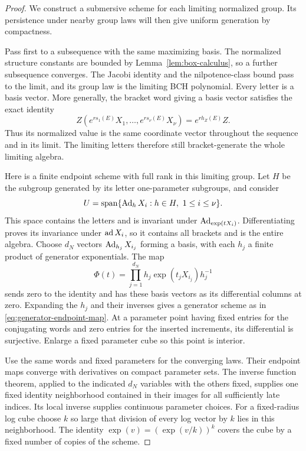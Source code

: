 \begin{proof}
We construct a submersive scheme for each limiting normalized group.
Its persistence under nearby group laws will then give uniform generation
by compactness.

Pass first to a subsequence with the same maximizing basis. The
normalized structure constants are bounded by
Lemma~\ref{lem:box-calculus}, so a further subsequence converges.
The Jacobi identity and the nilpotence-class bound pass to the
limit, and its group law is the limiting BCH polynomial.
Every letter is a basis vector. More generally, the bracket word
giving a basis vector satisfies the exact identity
\[
 Z(e^{rs_1(E)}X_1,\ldots,e^{rs_\nu(E)}X_\nu)=e^{rh_Z(E)}Z.
\]
Thus its normalized value is the same coordinate vector throughout
the sequence and in its limit. The limiting letters therefore still
bracket-generate the whole limiting algebra.

Here is a finite endpoint scheme with full rank in this limiting
group. Let $H$ be the subgroup generated by its letter
one-parameter subgroups, and consider
\[
 U=\operatorname{span}\{\operatorname{Ad}_hX_i:h\in H,\ 1\le i\le\nu\}.
\]
This space contains the letters and is invariant under
$\operatorname{Ad}_{\exp(tX_i)}$. Differentiating proves its invariance under
$\operatorname{ad} X_i$, so it contains all brackets and is the entire algebra.
Choose $d_N$ vectors $\operatorname{Ad}_{h_j}X_{i_j}$ forming a basis, with each
$h_j$ a finite product of generator exponentials. The map
\begin{equation}\label{eq:submersive-conjugate-scheme}
 \Phi(t)=\prod_{j=1}^{d_N}h_j\exp(t_jX_{i_j})h_j^{-1}
\end{equation}
sends zero to the identity and has these basis vectors as its
differential columns at zero. Expanding the $h_j$ and their inverses
gives a generator scheme as in \eqref{eq:generator-endpoint-map}.
At a parameter point having fixed entries for the conjugating words
and zero entries for the inserted increments, its differential is
surjective. Enlarge a fixed parameter cube so this point is interior.

Use the same words and fixed parameters for the converging laws.
Their endpoint maps converge with derivatives on compact parameter
sets. The inverse function theorem, applied to the indicated
$d_N$ variables with the others fixed, supplies one fixed identity
neighborhood contained in their images for all sufficiently late
indices. Its local inverse supplies continuous parameter choices.
For a fixed-radius log cube choose $k$ so large that division of
every log vector by $k$ lies in this neighborhood. The identity
$\exp(v)=(\exp(v/k))^k$ covers the cube by a fixed number of copies
of the scheme.


\end{proof}
